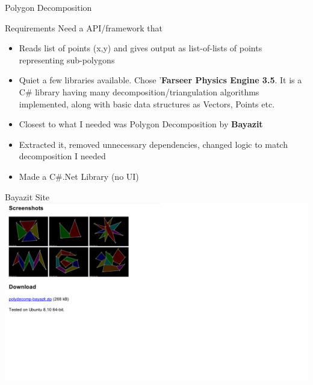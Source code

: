 \begin{frame}{Polygon Decomposition}
\begin{block}{Requirements}
Need a API/framework that 
\begin{itemize}
\item Reads list of points (x,y) and gives output as list-of-lists of points representing sub-polygons 
\item Quiet a few libraries available. Chose '\textbf{Farseer Physics Engine 3.5}. It is a C\# library having many decomposition/triangulation algorithms implemented, along with basic data structures as Vectors, Points etc.
\item Closest to what I needed was Polygon Decomposition by \textbf{Bayazit}
\item Extracted it, removed unnecessary dependencies, changed logic to match decomposition I needed
\item Made a C\#.Net Library (no UI)
\end{itemize}
\end{block}
\end{frame}
\begin{frame}{Bayazit Site}
\includegraphics[width=2\linewidth]{../Common/images/ImplBayazitSite.png}
\end{frame}

